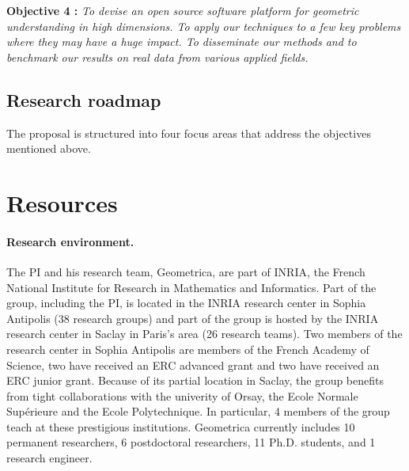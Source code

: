 {\bf Objective 4 :}   {\em To devise an open source {\em  software platform for geometric understanding in high dimensions}. %
To apply our techniques to a few key problems where they may have a huge impact. To disseminate our methods and to benchmark our results on real data from various applied fields.}

\subsection{Research roadmap} 


%


The proposal is structured into four focus areas that address the objectives mentioned above.









\section{Resources}

\paragraph{Research environment.}
The PI and his research team, Geometrica, are part of INRIA, the French National Institute for Research in Mathematics and Informatics. Part of the group, including the PI, is located in the INRIA research center in Sophia Antipolis  (38 research groups) and part of the group is hosted by the INRIA research center in Saclay in Paris's area (26 research teams). Two members of the research center in Sophia Antipolis are members of the French Academy of Science, two have received an ERC advanced grant and two have received an ERC junior grant. Because of its partial location in Saclay, the group benefits from tight collaborations with the univerity of Orsay, the Ecole Normale Sup\'erieure and the Ecole Polytechnique. In particular, 4 members of the group teach at these prestigious institutions. Geometrica currently includes 10 permanent researchers,  6 postdoctoral researchers, 11 Ph.D. students, and 1 research engineer. 

